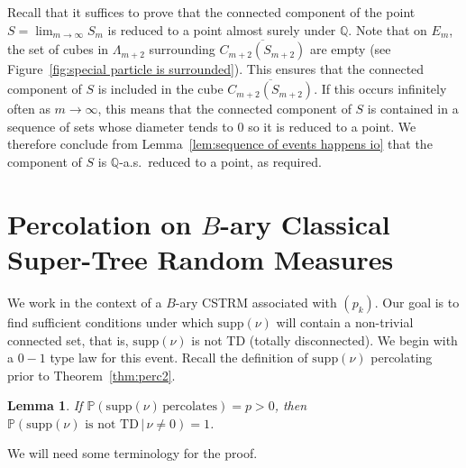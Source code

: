 \documentclass[12pt]{article}
\makeatletter
\renewenvironment{proof}[1][\proofname]{%
\par\pushQED{\qed}\normalfont%
\topsep6\p@\@plus6\p@\relax
\trivlist\item[\hskip\labelsep\bfseries#1\@addpunct{.}]%
\ignorespaces
}{%
\popQED\endtrivlist\@endpefalse
}
\numberwithin{theorem}{section}
\newtheorem{lemma}[theorem]{Lemma}
\theoremstyle{def}
\numberwithin{equation}{section}
\renewcommand{\P}{\mathbb{P}}
\newcommand{\Q}{\mathbb{Q}}
\newcommand{\supp}{\mathrm{supp}}
\makeatother
\begin{document}
\begin{proof}[Proof of Theorem~\ref{thm:weak disconnectedness}]
Recall that it suffices to prove  that the connected component of the point $S=\lim_{m\to\infty} S_m$ is reduced to a point almost surely under $\Q$.
Note that on $E_m$, the set of cubes in $\Lambda_{m+2}$ surrounding $\overline{C_{m+2}(S_{m+2})}$ are empty (see Figure~\ref{fig:special particle is surrounded}).
This ensures that the connected component of $S$ is included in the cube $\overline{C_{m+2}(S_{m+2})}$. 
If this occurs infinitely often as $m\rightarrow \infty$, this means that the connected component of $S$ is contained in a sequence of sets whose diameter tends to $0$ so it is reduced to a point.
We therefore conclude from Lemma~\ref{lem:sequence of events happens io} that the component of $S$ is $\Q$-a.s.\ reduced to a point, as required. 
\end{proof}


\section{Percolation on $B$-ary Classical Super-Tree Random Measures}\label{sec:percn}


We work in the context of a $B$-ary CSTRM associated with $(p_k)$. Our goal is to find sufficient conditions under which $\supp(\nu)$ will contain a non-trivial connected set, that is, $\supp(\nu)$ is not TD (totally disconnected).  We begin with a $0-1$ type law for this event. Recall the definition of $\supp(\nu)$ percolating prior to Theorem~\ref{thm:perc2}.
\begin{lemma} \label{lem:01}If $\P(\supp(\nu)\,\text{percolates})=p>0$, then 
$\P(\supp(\nu)\text{ is not TD}\,|\,\nu\neq 0)=1$.
\end{lemma}
\noindent We will need some terminology for the proof.
\end{document}
